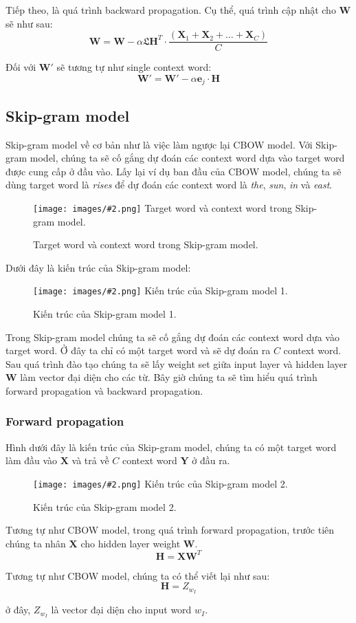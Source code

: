 \documentclass[12pt]{article}
\newcommand{\twiceIndent}{\hspace{\parindent}}
\newcommand{\includeImage}[3]{
\begin{figure}[H]
  \centering
  \texttt{[image: images/\#2.png]}
  \def\temp{#3}\ifx\temp\empty\else\caption{#3}\fi
\end{figure}}
\begin{document}
\indent Tiếp theo, là quá trình backward propagation. Cụ thể, quá trình cập nhật cho $\boldsymbol{W}$ sẽ như sau:
$$\boldsymbol{W} = \boldsymbol{W} - \alpha \mathfrak{L} \boldsymbol{H}^T \cdot \dfrac{(\boldsymbol{X}_1 + \boldsymbol{X}_2 + \hdots + \boldsymbol{X}_C)}{C}$$

\indent Đối với $\boldsymbol{W'}$ sẽ tương tự như single context word:
$$\boldsymbol{W'} = \boldsymbol{W'} - \alpha \boldsymbol{e}_j \cdot \boldsymbol{H}$$

\subsection{Skip-gram model}
Skip-gram model về cơ bản như là việc làm ngược lại CBOW model. Với Skip-gram model, chúng ta sẽ cố gắng dự đoán các context word dựa vào target word được cung cấp ở đầu vào. Lấy lại ví dụ ban đầu của CBOW model, chúng ta sẽ dùng target word là \textsl{rises} để dự đoán các context word là \textsl{the}, \textsl{sun}, \textsl{in} và \textsl{east}.

\includeImage{0.7}{04}{Target word và context word trong Skip-gram model.}

\indent Dưới đây là kiến trúc của Skip-gram model:
\includeImage{1}{09}{Kiến trúc của Skip-gram model 1.}

\indent Trong Skip-gram model chúng ta sẽ cố gắng dự đoán các context word dựa vào target word. Ở đây ta chỉ có một target word và sẽ dự đoán ra $C$ context word. Sau quá trình đào tạo chúng ta sẽ lấy weight set giữa input layer và hidden layer $\boldsymbol{W}$ làm vector đại diện cho các từ. Bây giờ chúng ta sẽ tìm hiểu quá trình forward propagation và backward propagation.

\subsubsection{Forward propagation}
Hình dưới đây là kiến trúc của Skip-gram model, chúng ta có một target word làm đầu vào $\boldsymbol{X}$ và trả về $C$ context word $\boldsymbol{Y}$ ở đầu ra.
\includeImage{1}{10}{Kiến trúc của Skip-gram model 2.}

\indent Tương tự như CBOW model, trong quá trình forward propagation, trước tiên chúng ta nhân $\boldsymbol{X}$ cho hidden layer weight $\boldsymbol{W}$.
$$\boldsymbol{H} = \boldsymbol{XW}^T$$

\indent Tương tự như CBOW model, chúng ta có thể viết lại như sau:
$$\boldsymbol{H} = Z_{w_I}$$

\twiceIndent ở đây, $Z_{w_I}$ là vector đại diện cho input word $w_I$.\\
\end{document}
